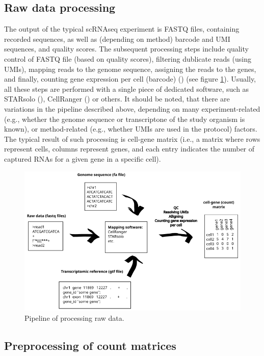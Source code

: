 \subsection{Raw data processing}
\label{sec:rawData}

The output of the typical scRNAseq experiment is FASTQ files, containing recorded sequences,
as well as (depending on method) barcode and UMI sequences, and quality scores.
The subsequent processing steps include quality control of FASTQ file (based on quality scores),
filtering dublicate reads (using UMIs), mapping reads to the genome sequence, assigning the reads to the genes,
and finally, counting gene expression per cell (barcode) (\cite{Heumos2023}) (see figure \ref{fig:rawData}).
Usually, all these steps are performed with a single piece of dedicated software,
such as STARsolo (\cite{Kaminow2021}), CellRanger (\cite{Zheng2017}) or others.
It should be noted, that there are variations in the pipeline described above,
depending on many experiment-related (e.g., whether the genome sequence or transcriptone of the study organism is known),
or method-related (e.g., whether UMIs are used in the protocol) factors.
The typical result of such processing is cell-gene matrix (i.e., a matrix where rows represent cells,
columns represent genes, and each entry indicates the number of captured RNAs for a given gene in a specific cell).

\begin{figure}
  \centering
  \includegraphics[width=\linewidth]{images/rawdata.png}
  \caption{Pipeline of processing raw data.}
  \label{fig:rawData}
\end{figure}

\subsection{Preprocessing of count matrices}

